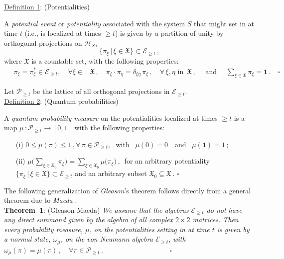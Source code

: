 \documentclass[a4paper,11pt]{article}
\begin{document}
\underline{Definition 1}: (Potentialities)

A \textit{potential event} or \textit{potentiality} associated with the system $S$ that might set in at time $t$ (i.e., is localized
at times $\geq t$) is given by a partition of unity by orthogonal projections on $\mathcal{H}_S$,
$$\big\{ \pi_{\xi}\, \vert \,\xi \in \mathfrak{X} \big\} \subset \mathcal{E}_{\geq t}\,,$$
where $\mathfrak{X}$ is a countable set, with the following properties:
\begin{align}\label{potentialty}
\quad \pi_{\xi}= \pi_{\xi}^{*} \in \mathcal{E}_{\geq t}, \quad \forall \xi \in &\mathfrak{X}\,,\quad
\pi_{\xi}\cdot\pi_{\eta} = \delta_{\xi \eta}\, \pi_{\xi} \,, \quad \forall\, \xi, \eta \text{ in }\, \mathfrak{X}\,, \quad
\text{ and } \quad \sum_{\xi \in \mathfrak{X}} \pi_{\xi} = \mathbf{1}\,.\quad \square
\end{align}

Let $\mathcal{P}_{\geq t}$ be the lattice of all orthogonal projections in $\mathcal{E}_{\geq t}$. \\

\underline{Definition 2}: (Quantum probabilities)

A \textit{quantum probability measure} on the potentialities localized at times  $\geq t$ is a map 
$\mu\,: \mathcal{P}_{\geq t} \rightarrow [0, 1]$ with the following properties:
\begin{enumerate}
\item[(i)]{ $0 \leq \mu(\pi) \leq 1\,, \forall\, \pi \in \mathcal{P}_{\geq t},$ \,\,with \,\,\,$\mu(0)=0\,$ \, and \, $\mu(\mathbf{1})=1\,$;}
\item[(ii)]{ $\mu\big(\sum_{\xi \in \mathfrak{X}_0} \pi_{\xi}\big) = 
\sum_{\xi \in \mathfrak{X}_0} \mu\big(\pi_{\xi}\big)\,,$
\,for an arbitrary potentiality $\big\{ \pi_{\xi}\, \vert\, \xi \in \mathfrak{X} \big\} \subset \mathcal{E}_{\geq t}$ and 
an arbitrary subset $\mathfrak{X}_0 \subseteq \mathfrak{X}$\,.
\hspace{11cm}$\square$}
\end{enumerate}

The following generalization of \textit{Gleason}'s theorem \cite{Gleason} follows directly from a general theorem due to  
\textit{Maeda} \cite{Maeda}.\\

{\bf{Theorem~1}}: (Gleason-Maeda) \textit{We assume that the algebras $\mathcal{E}_{\geq t}$ do not have any direct 
summand given by the algebra of all complex $2\times 2$ matrices. Then every probability measure, $\mu$, on the 
potentialities setting in at time $t$ is given by a normal state, $\omega_{\mu}$, on the von Neumann algebra 
$\mathcal{E}_{\geq t}$, with \\ 
\vspace{0.1cm}\hspace{5.9cm}
$ \omega_{\mu}(\pi) = \mu(\pi)\,,\quad  \forall \pi \in \mathcal{P}_{\geq t}\,. \hspace{4cm} \square$
}\\
\end{document}
